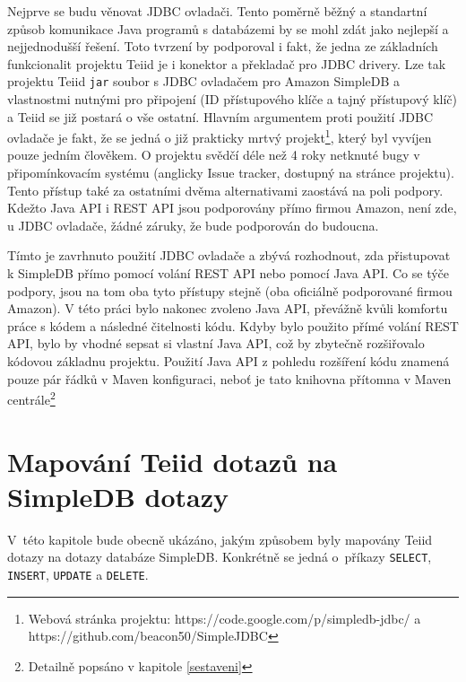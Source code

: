 \documentclass[oneside,12pt]{fithesis2}
\begin{document}
Nejprve se budu věnovat JDBC ovladači. Tento poměrně běžný a standartní způsob komunikace Java programů s databázemi by se mohl zdát jako nejlepší a nejjednodušší řešení. Toto tvrzení by podporoval i fakt, že jedna ze základních funkcionalit projektu Teiid je i konektor a překladač pro JDBC drivery. Lze tak  projektu Teiid \verb&jar& soubor s JDBC ovladačem pro Amazon SimpleDB a vlastnostmi nutnými pro připojení (ID přístupového klíče a tajný přístupový klíč) a Teiid se již postará o vše ostatní. Hlavním argumentem proti použití JDBC ovladače je fakt, že se jedná o již prakticky mrtvý projekt\footnote{Webová stránka projektu: https://code.google.com/p/simpledb-jdbc/ a https://github.com/beacon50/SimpleJDBC}, který byl vyvíjen pouze jedním člověkem. O  projektu svědčí déle než  4 roky netknuté bugy v připomínkovacím systému (anglicky Issue tracker, dostupný na stránce projektu). Tento přístup také za ostatními dvěma alternativami zaostává na poli podpory. Kdežto Java API i REST API jsou podporovány přímo firmou Amazon, není zde, u JDBC ovladače, žádné záruky, že bude podporován do budoucna.

Tímto je zavrhnuto použití JDBC ovladače a zbývá rozhodnout, zda přistupovat k SimpleDB přímo pomocí volání REST API nebo pomocí Java API. Co se týče podpory, jsou na tom oba tyto přístupy stejně (oba oficiálně podporované firmou Amazon). V této práci bylo nakonec zvoleno Java API, převážně kvůli komfortu práce s kódem a následné čitelnosti kódu. Kdyby bylo použito přímé volání REST API, bylo by vhodné sepsat si vlastní Java API, což by zbytečně rozšiřovalo kódovou základnu projektu. Použití Java API z pohledu rozšíření kódu znamená pouze pár řádků v Maven konfiguraci, neboť je tato knihovna přítomna v Maven centrále\footnote{Detailně popsáno v kapitole \ref{sestaveni}}

\chapter{Mapování Teiid dotazů na SimpleDB dotazy}
V~této kapitole bude obecně ukázáno, jakým způsobem byly mapovány Teiid dotazy na dotazy databáze SimpleDB. Konkrétně se jedná o~příkazy \verb<SELECT<, \verb<INSERT<, \verb<UPDATE< a \verb<DELETE<.
\end{document}

